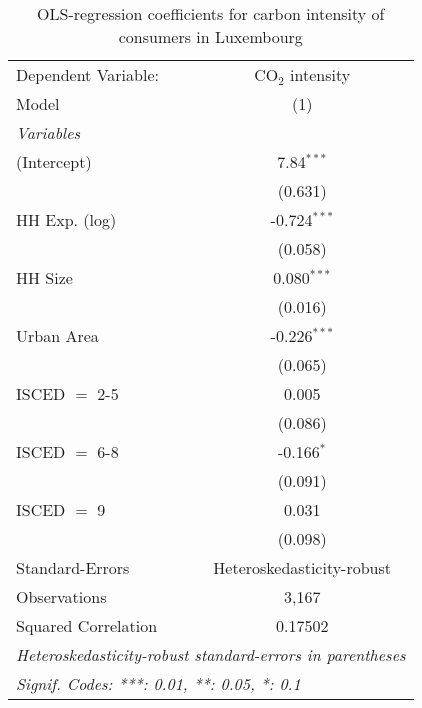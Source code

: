 
\begin{table}[htbp!]
   \centering
   \small
   \begin{adjustbox}{width = 1\textwidth, max height = 0.95\textheight, center}
      \begin{threeparttable}[b]
         \caption{\label{tab:OLS_1_LUX} OLS-regression coefficients for carbon intensity of consumers in Luxembourg}
         \begin{tabular}{lc}
            \tabularnewline \midrule \midrule
            Dependent Variable: & CO$_{2}$ intensity\\  
            Model               & (1)\\  
            \midrule
            \emph{Variables}\\
            (Intercept)         & 7.84$^{***}$\\   
                                & (0.631)\\   
            HH Exp. (log)       & -0.724$^{***}$\\   
                                & (0.058)\\   
            HH Size             & 0.080$^{***}$\\   
                                & (0.016)\\   
            Urban Area          & -0.226$^{***}$\\   
                                & (0.065)\\   
            ISCED $=$ 2-5       & 0.005\\   
                                & (0.086)\\   
            ISCED $=$ 6-8       & -0.166$^{*}$\\   
                                & (0.091)\\   
            ISCED $=$ 9         & 0.031\\   
                                & (0.098)\\   
            \midrule 
            Standard-Errors     & Heteroskedasticity-robust \\   
            Observations        & 3,167\\  
            Squared Correlation & 0.17502\\  
            \midrule \midrule
            \multicolumn{2}{l}{\emph{Heteroskedasticity-robust standard-errors in parentheses}}\\
            \multicolumn{2}{l}{\emph{Signif. Codes: ***: 0.01, **: 0.05, *: 0.1}}\\
         \end{tabular}
         

\end{threeparttable}
\end{adjustbox}
\end{table}
